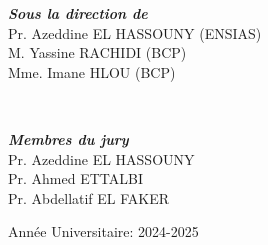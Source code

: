 \begin{titlepage}
\begin{center}
\begin{minipage}{0.5\textwidth}
\begin{flushleft}
  \end{flushleft}
\end{minipage}
\begin{minipage}{0.4\textwidth}
  \begin{flushright} 
    \emph{\bfseries Sous la direction de} \\[0.2cm]
    Pr. Azeddine EL HASSOUNY (ENSIAS) \\
    M. Yassine RACHIDI (BCP)  \\
    Mme. Imane HLOU (BCP)
  \end{flushright}
\end{minipage}\\[1cm]

\begin{center}
        \emph{\bfseries Membres du jury} \\[0.2cm]
        Pr. Azeddine EL HASSOUNY \\[0.2cm]
        Pr. Ahmed ETTALBI \\[0.2cm]
        Pr. Abdellatif EL FAKER
\end{center}
  
  
  

  \vspace{0.4cm} 	
  \begin{center}
    {Année Universitaire: 2024-2025}
  \end{center}

   \end{center}
\end{titlepage}